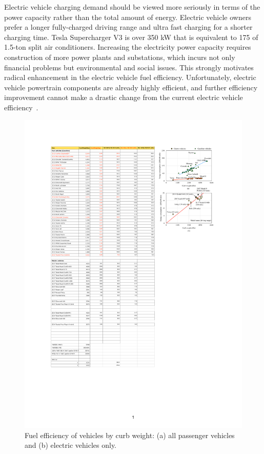 \documentclass[journal]{IEEEtran}
\begin{document}
Electric vehicle charging demand should be viewed more seriously in terms of the power capacity rather than the total amount of energy. 
Electric vehicle owners prefer a longer fully-charged driving range and ultra fast charging for a shorter charging time. 
Tesla Supercharger V3 is over 350 kW that is equivalent to 175 of 1.5-ton split air conditioners. Increasing the electricity power capacity requires construction of more power plants and substations, which incurs not only financial problems but environmental and social issues. This strongly motivates radical enhancement in the electric vehicle fuel efficiency. Unfortunately, electric vehicle powertrain components are already highly efficient, and further efficiency improvement cannot make a drastic change from the current electric vehicle efficiency~\cite{Burress:OAK_RIDGE16}.

\begin{figure}
\centering
\includegraphics[width=0.9\hsize]{Figures/fuel_efficiency.pdf}
\caption{Fuel efficiency of vehicles by curb weight: (a) all passenger vehicles and (b) electric vehicles only.}
\label{fig:fuel_efficiency}
\end{figure}      
\end{document}
